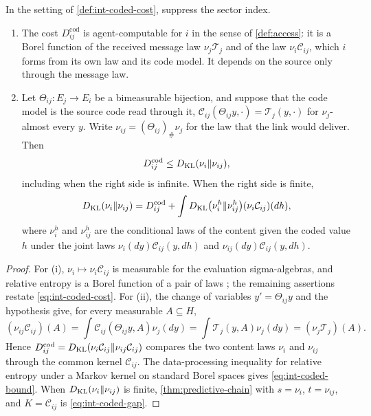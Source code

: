 In the setting of \cref{def:int-coded-cost}, suppress the sector index.
\begin{enumerate}
\item[(i)] The cost $D_{ij}^{\mathrm{cod}}$ is agent-computable for $i$ in the sense of \cref{def:access}: it is a Borel function of the received message law $\nu_j\mathcal T_j$ and of the law $\nu_i\mathcal C_{ij}$, which $i$ forms from its own law and its code model. It depends on the source only through the message law.
\item[(ii)] Let $\Theta_{ij}:E_j\to E_i$ be a bimeasurable bijection, and suppose that the code model is the source code read through it, $\mathcal C_{ij}(\Theta_{ij}y,\cdot)=\mathcal T_j(y,\cdot)$ for $\nu_j$-almost every $y$. Write $\nu_{ij}=(\Theta_{ij})_\#\nu_j$ for the law that the link would deliver. Then
\begin{equation}
D_{ij}^{\mathrm{cod}}\leq D_{\mathrm{KL}}(\nu_i\Vert\nu_{ij}),
\label{eq:int-coded-bound}
\end{equation}
including when the right side is infinite. When the right side is finite,
\begin{equation}
D_{\mathrm{KL}}(\nu_i\Vert\nu_{ij})
=D_{ij}^{\mathrm{cod}}
+\int D_{\mathrm{KL}}\bigl(\nu_i^h\Vert\nu_{ij}^h\bigr)(\nu_i\mathcal C_{ij})(dh),
\label{eq:int-coded-gap}
\end{equation}
where $\nu_i^h$ and $\nu_{ij}^h$ are the conditional laws of the content given the coded value $h$ under the joint laws $\nu_i(dy)\mathcal C_{ij}(y,dh)$ and $\nu_{ij}(dy)\mathcal C_{ij}(y,dh)$.
\end{enumerate}
\begin{proof}
For (i), $\nu_i\mapsto\nu_i\mathcal C_{ij}$ is measurable for the evaluation sigma-algebras, and relative entropy is a Borel function of a pair of laws \citep[Lemma~5.2.2]{Gray1990}; the remaining assertions restate \cref{eq:int-coded-cost}. For (ii), the change of variables $y'=\Theta_{ij}y$ and the hypothesis give, for every measurable $A\subseteq H$,
\begin{equation}
(\nu_{ij}\mathcal C_{ij})(A)
=\int\mathcal C_{ij}(\Theta_{ij}y,A)\nu_j(dy)
=\int\mathcal T_j(y,A)\nu_j(dy)
=(\nu_j\mathcal T_j)(A).
\end{equation}
Hence $D_{ij}^{\mathrm{cod}}=D_{\mathrm{KL}}(\nu_i\mathcal C_{ij}\Vert\nu_{ij}\mathcal C_{ij})$ compares the two content laws $\nu_i$ and $\nu_{ij}$ through the common kernel $\mathcal C_{ij}$. The data-processing inequality for relative entropy under a Markov kernel on standard Borel spaces \citep[Chapter~5]{Gray1990} gives \cref{eq:int-coded-bound}. When $D_{\mathrm{KL}}(\nu_i\Vert\nu_{ij})$ is finite, \cref{thm:predictive-chain} with $s=\nu_i$, $t=\nu_{ij}$, and $K=\mathcal C_{ij}$ is \cref{eq:int-coded-gap}.
\end{proof}

